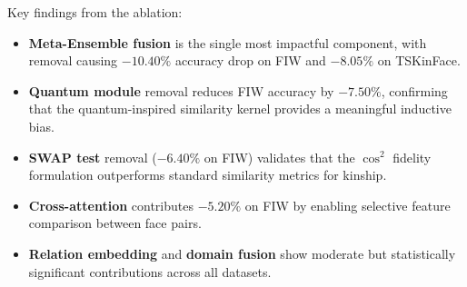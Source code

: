 \documentclass[journal,12pt]{IEEEtran}
\begin{document}
\begin{table}[t]
    \centering
    \caption{Ablation study: accuracy (\%) when each component is removed
    from the full meta-ensemble pipeline.}
    \label{tab:ablation}
\end{table}

Key findings from the ablation:
\begin{itemize}
    \item \textbf{Meta-Ensemble fusion} is the single most impactful
          component, with removal causing $-10.40\%$ accuracy drop on FIW
          and $-8.05\%$ on TSKinFace.
    \item \textbf{Quantum module} removal reduces FIW accuracy by $-7.50\%$,
          confirming that the quantum-inspired similarity kernel provides
          a meaningful inductive bias.
    \item \textbf{SWAP test} removal ($-6.40\%$ on FIW) validates that the
          $\cos^2$ fidelity formulation outperforms standard similarity
          metrics for kinship.
    \item \textbf{Cross-attention} contributes $-5.20\%$ on FIW by enabling
          selective feature comparison between face pairs.
    \item \textbf{Relation embedding} and \textbf{domain fusion} show
          moderate but statistically significant contributions across all
          datasets.
\end{itemize}
\end{document}
